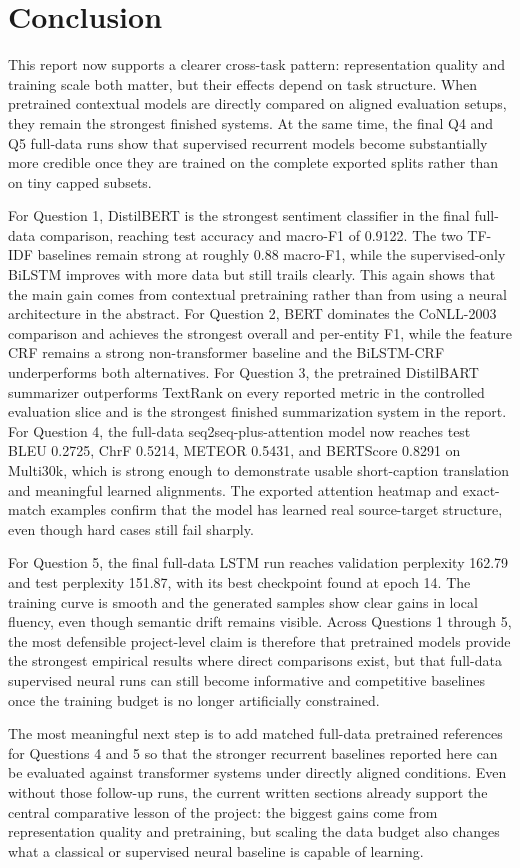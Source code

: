 \section{Conclusion}

This report now supports a clearer cross-task pattern: representation quality and training scale both matter, but their effects depend on task structure. When pretrained contextual models are directly compared on aligned evaluation setups, they remain the strongest finished systems. At the same time, the final Q4 and Q5 full-data runs show that supervised recurrent models become substantially more credible once they are trained on the complete exported splits rather than on tiny capped subsets.

For Question 1, DistilBERT is the strongest sentiment classifier in the final full-data comparison, reaching test accuracy and macro-F1 of 0.9122. The two TF-IDF baselines remain strong at roughly 0.88 macro-F1, while the supervised-only BiLSTM improves with more data but still trails clearly. This again shows that the main gain comes from contextual pretraining rather than from using a neural architecture in the abstract. For Question 2, BERT dominates the CoNLL-2003 comparison and achieves the strongest overall and per-entity F1, while the feature CRF remains a strong non-transformer baseline and the BiLSTM-CRF underperforms both alternatives. For Question 3, the pretrained DistilBART summarizer outperforms TextRank on every reported metric in the controlled evaluation slice and is the strongest finished summarization system in the report. For Question 4, the full-data seq2seq-plus-attention model now reaches test BLEU 0.2725, ChrF 0.5214, METEOR 0.5431, and BERTScore 0.8291 on Multi30k, which is strong enough to demonstrate usable short-caption translation and meaningful learned alignments. The exported attention heatmap and exact-match examples confirm that the model has learned real source-target structure, even though hard cases still fail sharply.

For Question 5, the final full-data LSTM run reaches validation perplexity 162.79 and test perplexity 151.87, with its best checkpoint found at epoch 14. The training curve is smooth and the generated samples show clear gains in local fluency, even though semantic drift remains visible. Across Questions 1 through 5, the most defensible project-level claim is therefore that pretrained models provide the strongest empirical results where direct comparisons exist, but that full-data supervised neural runs can still become informative and competitive baselines once the training budget is no longer artificially constrained.

The most meaningful next step is to add matched full-data pretrained references for Questions 4 and 5 so that the stronger recurrent baselines reported here can be evaluated against transformer systems under directly aligned conditions. Even without those follow-up runs, the current written sections already support the central comparative lesson of the project: the biggest gains come from representation quality and pretraining, but scaling the data budget also changes what a classical or supervised neural baseline is capable of learning.